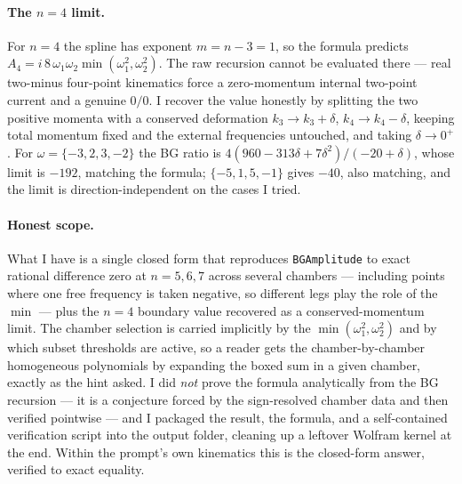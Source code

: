 \documentclass{article}
\begin{document}
\paragraph{The $n=4$ limit.}
For $n=4$ the spline has exponent $m=n-3=1$, so the formula predicts
$A_4=i\,8\,\omega_1\omega_2\min(\omega_1^2,\omega_2^2)$. The raw recursion cannot
be evaluated there --- real two-minus four-point kinematics force a zero-momentum
internal two-point current and a genuine $0/0$. I recover the value honestly by
splitting the two positive momenta with a conserved deformation
$k_3\to k_3+\delta$, $k_4\to k_4-\delta$, keeping total momentum fixed and the
external frequencies untouched, and taking $\delta\to0^+$. For
$\omega=\{-3,2,3,-2\}$ the BG ratio is $4(960-313\delta+7\delta^2)/(-20+\delta)$,
whose limit is $-192$, matching the formula; $\{-5,1,5,-1\}$ gives $-40$, also
matching, and the limit is direction-independent on the cases I tried.

\paragraph{Honest scope.}
What I have is a single closed form that reproduces \texttt{BGAmplitude} to exact
rational difference zero at $n=5,6,7$ across several chambers --- including points
where one free frequency is taken negative, so different legs play the role of the
$\min$ --- plus the $n=4$ boundary value recovered as a conserved-momentum limit.
The chamber selection is carried implicitly by the $\min(\omega_1^2,\omega_2^2)$
and by which subset thresholds are active, so a reader gets the chamber-by-chamber
homogeneous polynomials by expanding the boxed sum in a given chamber, exactly as
the hint asked. I did \emph{not} prove the formula analytically from the BG
recursion --- it is a conjecture forced by the sign-resolved chamber data and
then verified pointwise --- and I packaged the result, the formula, and a
self-contained verification script into the output folder, cleaning up a leftover
Wolfram kernel at the end. Within the prompt's own kinematics this is the
closed-form answer, verified to exact equality.
\end{document}
